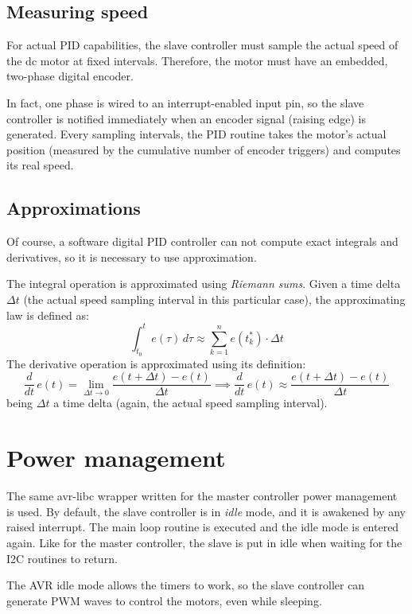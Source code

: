 \documentclass[binding=0.6cm,Lau]{sapthesis}
\begin{document}
\subsection{Measuring speed}
For actual PID capabilities, the slave controller must sample the actual speed
of the dc motor at fixed intervals. Therefore, the motor must have an embedded,
two-phase digital encoder.

In fact, one phase is wired to an interrupt-enabled input pin, so the slave
controller is notified immediately when an encoder signal (raising edge) is
generated. Every sampling intervals, the PID routine takes the motor's actual
position (measured by the cumulative number of encoder triggers) and computes
its real speed.

\subsection{Approximations}
Of course, a software digital PID controller can not compute exact integrals
and derivatives, so it is necessary to use approximation.

The integral operation is approximated using \emph{Riemann sums}. Given a time
delta $\Delta t$ (the actual speed sampling interval in this particular case),
the approximating law is defined as:
\begin{equation}
  \int_{t_0}^t e(\tau)\,d\tau \approx \sum_{k=1}^n e(t_k^*) \cdot \Delta t
\end{equation}
The derivative operation is approximated using its
definition\cite{levy-num-analysis}:
\begin{equation}
  \frac{d}{dt}\,e(t) = \lim_{\Delta t \to 0} \frac{e(t + \Delta t) - e(t)}{\Delta t} \implies
  \frac{d}{dt}\,e(t) \approx \frac{e(t + \Delta t) - e(t)}{\Delta t}
\end{equation}
being $\Delta t$ a time delta (again, the actual speed sampling interval).

\section{Power management}
The same avr-libc wrapper written for the master controller power management is
used.
By default, the slave controller is in \emph{idle} mode, and it is awakened by
any raised interrupt. The main loop routine is executed and the idle mode is
entered again. Like for the master controller, the slave is put in idle when
waiting for the I2C routines to return.

The AVR idle mode allows the timers to work, so the slave controller can
generate PWM waves to control the motors, even while sleeping.
\end{document}
